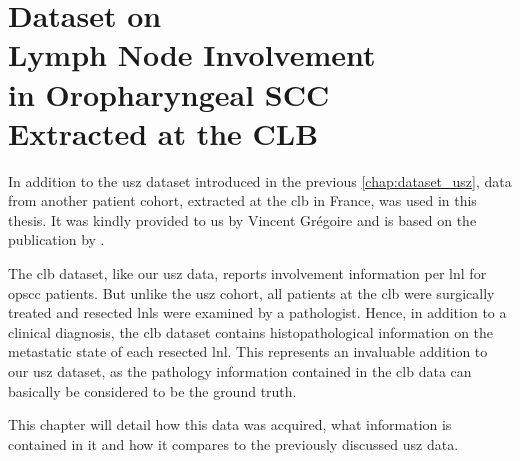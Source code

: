\documentclass[\relativeRoot/main.tex]{subfiles}
\begin{document}
\chapter[
    CLB Dataset on Lymph Node Involvement in OPSCC
]{
    Dataset on\\Lymph Node Involvement\\in Oropharyngeal SCC\\Extracted at the CLB
}
\label{chap:dataset_clb}

In addition to the \gls{usz} dataset introduced in the previous \cref{chap:dataset_usz}, data from another patient cohort, extracted at the \gls{clb} in France, was used in this thesis. It was kindly provided to us by Vincent Grégoire and is based on the publication by .

The \gls{clb} dataset, like our \gls{usz} data, reports involvement information per \gls{lnl} for \gls{opscc} patients. But unlike the \gls{usz} cohort, all patients at the \gls{clb} were surgically treated and resected \glspl{lnl} were examined by a pathologist. Hence, in addition to a clinical diagnosis, the \gls{clb} dataset contains histopathological information on the metastatic state of each resected \gls{lnl}. This represents an invaluable addition to our \gls{usz} dataset, as the pathology information contained in the \gls{clb} data can basically be considered to be the ground truth.

This chapter will detail how this data was acquired, what information is contained in it and how it compares to the previously discussed \gls{usz} data.







\end{document}
